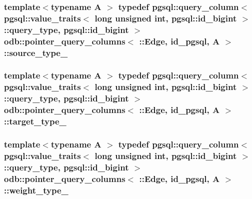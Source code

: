 \subsubsection[{source\+\_\+type\+\_\+}]{\setlength{\rightskip}{0pt plus 5cm}template$<$typename A $>$ typedef pgsql\+::query\+\_\+column$<$ pgsql\+::value\+\_\+traits$<$ long unsigned int, pgsql\+::id\+\_\+bigint $>$\+::query\+\_\+type, pgsql\+::id\+\_\+bigint $>$ odb\+::pointer\+\_\+query\+\_\+columns$<$ \+::{\bf Edge}, id\+\_\+pgsql, A $>$\+::{\bf source\+\_\+type\+\_\+}}\label{structodb_1_1pointer__query__columns_3_01_1_1_edge_00_01id__pgsql_00_01_a_01_4_a1ffe36e7e69a82a3db331bf051b63b5b}
\hypertarget{structodb_1_1pointer__query__columns_3_01_1_1_edge_00_01id__pgsql_00_01_a_01_4_abf77224bd05ad36dff61edc27c551cf7}{}
\subsubsection[{target\+\_\+type\+\_\+}]{\setlength{\rightskip}{0pt plus 5cm}template$<$typename A $>$ typedef pgsql\+::query\+\_\+column$<$ pgsql\+::value\+\_\+traits$<$ long unsigned int, pgsql\+::id\+\_\+bigint $>$\+::query\+\_\+type, pgsql\+::id\+\_\+bigint $>$ odb\+::pointer\+\_\+query\+\_\+columns$<$ \+::{\bf Edge}, id\+\_\+pgsql, A $>$\+::{\bf target\+\_\+type\+\_\+}}\label{structodb_1_1pointer__query__columns_3_01_1_1_edge_00_01id__pgsql_00_01_a_01_4_abf77224bd05ad36dff61edc27c551cf7}
\hypertarget{structodb_1_1pointer__query__columns_3_01_1_1_edge_00_01id__pgsql_00_01_a_01_4_a137db0e37f02168fb623e6cf7eb0569a}{}
\subsubsection[{weight\+\_\+type\+\_\+}]{\setlength{\rightskip}{0pt plus 5cm}template$<$typename A $>$ typedef pgsql\+::query\+\_\+column$<$ pgsql\+::value\+\_\+traits$<$ long unsigned int, pgsql\+::id\+\_\+bigint $>$\+::query\+\_\+type, pgsql\+::id\+\_\+bigint $>$ odb\+::pointer\+\_\+query\+\_\+columns$<$ \+::{\bf Edge}, id\+\_\+pgsql, A $>$\+::{\bf weight\+\_\+type\+\_\+}}\label{structodb_1_1pointer__query__columns_3_01_1_1_edge_00_01id__pgsql_00_01_a_01_4_a137db0e37f02168fb623e6cf7eb0569a}


